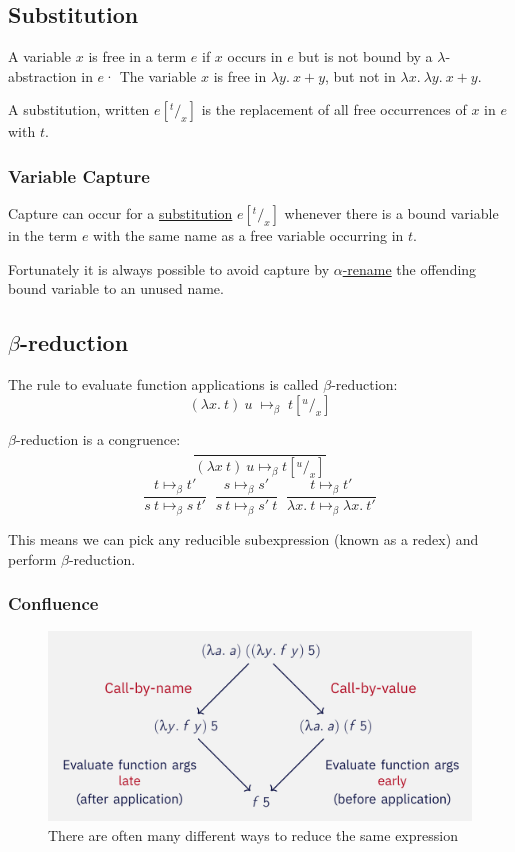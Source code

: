 \documentclass{article}
\begin{document}
\subsection{Substitution}\label{substitution}\label{free-variables}
A variable $x$ is free in a term $e$ if $x$ occurs in $e$ but is not bound by a $\lambda$-abstraction in $e$· The variable $x$ is free in $\lambda y.\:x+y$, but not in $\lambda x.\:\lambda y.\:x+y$.

A substitution, written $e[^t/_x]$ is the replacement of all free occurrences of $x$ in $e$ with $t$.

\subsubsection{Variable Capture}
Capture can occur for a \hyperref[substitution]{substitution} $e[^t/_x]$ whenever there is a bound variable in the term $e$ with the same name as a free variable occurring in $t$.

Fortunately it is always possible to avoid capture by \hyperref[alpha-renaming]{$\alpha$-rename} the offending bound variable to an unused name.

\subsection{$\beta$-reduction}\label{beta-reduction}
The rule to evaluate function applications is called $\beta$-reduction:
\[(\lambda x.\:t)\:u \; \mapsto_\beta \; t[^u/_x]\]

$\beta$-reduction is a congruence:
\[\frac{}{(\lambda x\:t)\:u \mapsto_\beta t[^u/_x]}\]
\[\frac{t \mapsto_\beta t'}{s\:t \mapsto_\beta s\:t'}\;\;\frac{s \mapsto_\beta s'}{s\:t \mapsto_\beta s'\:t}\;\;\frac{t \mapsto_\beta t'}{\lambda x.\:t \mapsto_\beta \lambda x.\:t'}\]

This means we can pick any reducible subexpression (known as a redex) and perform $\beta$-reduction.

\subsubsection{Confluence}\label{confluence}\label{church-rosser}
\begin{figure}[H]
    \centering
    \includegraphics[width=0.75\linewidth]{images/call-by.png}
    \caption{There are often many different ways to reduce the same expression}
\end{figure}
\end{document}

